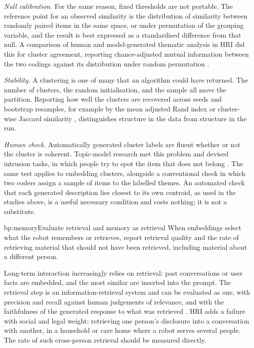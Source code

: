 \emph{Null calibration.} For the same reason, fixed thresholds are not
portable. The reference point for an observed similarity is the distribution
of similarity between randomly paired items in the same space, or under
permutation of the grouping variable, and the result is best expressed as a
standardised difference from that null. A comparison of human and
model-generated thematic analysis in HRI did this for cluster agreement,
reporting chance-adjusted mutual information between the two codings
against its distribution under random permutation
\cite{markelius2026evaluating}.

\emph{Stability.} A clustering is one of many that an algorithm could have
returned. The number of clusters, the random initialisation, and the sample
all move the partition. Reporting how well the clusters are recovered across
seeds and bootstrap resamples, for example by the mean adjusted Rand index or
cluster-wise Jaccard similarity \cite{hennig2007cluster}, distinguishes
structure in the data from structure in the run.

\emph{Human check.} Automatically generated cluster labels are fluent whether
or not the cluster is coherent. Topic-model research met this problem and
devised intrusion tasks, in which people try to spot the item that does not
belong \cite{chang2009reading}. The same test applies to embedding clusters,
alongside a conventional check in which two coders assign a sample of items
to the labelled themes. An automated check that each generated description
lies closest to its own centroid, as used in the studies above, is a useful
necessary condition and costs nothing; it is not a substitute.

\begin{practice}{bp:memory}{Evaluate retrieval and memory as retrieval}
When embeddings select what the robot remembers or retrieves, report
retrieval quality and the rate of retrieving material that should not have
been retrieved, including material about a different person.
\end{practice}

Long-term interaction increasingly relies on retrieval: past conversations or
user facts are embedded, and the most similar are inserted into the prompt.
The retrieval step is an information-retrieval system and can be evaluated as
one, with precision and recall against human judgements of relevance, and
with the faithfulness of the generated response to what was retrieved
\cite{es2024ragas}. HRI adds a failure with social and legal weight:
retrieving one person's disclosure into a conversation with another, in a
household or care home where a robot serves several people. The rate of such
cross-person retrieval should be measured directly.

